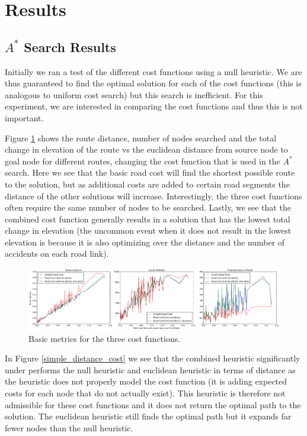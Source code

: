 \documentclass[11pt]{article}
\begin{document}
\section{Results}\label{results}

\subsection{$A^{*}$ Search Results}
Initially we ran a test of the different cost functions using a null heuristic. We are thus guaranteed to find the optimal solution for each of the cost functions (this is analogous to uniform cost search) but this search is inefficient. For this experiment, we are interested in comparing the cost functions and thus this is not important.
\par

Figure \ref{cost_comparison} shows the route distance, number of nodes searched and the total change in elevation of the route vs the euclidean distance from source node to goal node for different routes, changing the cost function that is used in the $A^{*}$ search. Here we see that the basic road cost will find the shortest possible route to the solution, but as additional costs are added to certain road segments the distance of the other solutions will increase. Interestingly, the three cost functions often require the same number of nodes to be searched. Lastly, we see that the combined cost function generally results in a solution that has the lowest total change in elevation (the uncommon event when it does not result in the lowest elevation is because it is also optimizing over the distance and the number of accidents on each road link).

\begin{figure}[H]
\includegraphics[width=1\textwidth]{../images/cost}
\caption{Basic metrics for the three cost functions.}
\label{cost_comparison}
\end{figure}

In Figure \ref{simple_distance_cost} we see that the combined heuristic significantly under performs the null heuristic and euclidean heuristic in terms of distance as the heuristic does not properly model the cost function (it is adding expected costs for each node that do not actually exist). This heuristic is therefore not admissible for these cost functions and it does not return the optimal path to the solution. The euclidean heuristic still finds the optimal path but it expands far fewer nodes than the null heuristic.
\end{document}

